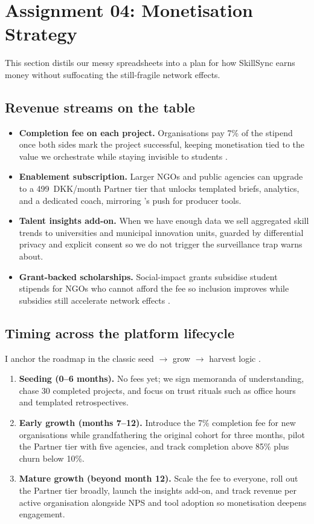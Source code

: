 \section*{Assignment 04: Monetisation Strategy}

This section distils our messy spreadsheets into a plan for how SkillSync earns money without suffocating the still-fragile network effects.

\subsection*{Revenue streams on the table}
\begin{itemize}
  \item \textbf{Completion fee on each project.} Organisations pay 7\% of the stipend once both sides mark the project successful, keeping monetisation tied to the value we orchestrate while staying invisible to students \citep{HagiuWright2013}.
  \item \textbf{Enablement subscription.} Larger NGOs and public agencies can upgrade to a 499~DKK/month Partner tier that unlocks templated briefs, analytics, and a dedicated coach, mirroring \citet{Choudary2016}'s push for producer tools.
  \item \textbf{Talent insights add-on.} When we have enough data we sell aggregated skill trends to universities and municipal innovation units, guarded by differential privacy and explicit consent so we do not trigger the surveillance trap \citet{Zuboff2019} warns about.
  \item \textbf{Grant-backed scholarships.} Social-impact grants subsidise student stipends for NGOs who cannot afford the fee so inclusion improves while subsidies still accelerate network effects \citep{ShapiroVarian1999}.
\end{itemize}

\subsection*{Timing across the platform lifecycle}
I anchor the roadmap in the classic seed $\rightarrow$ grow $\rightarrow$ harvest logic \citep{Choudary2016}.
\begin{enumerate}
  \item \textbf{Seeding (0--6 months).} No fees yet; we sign memoranda of understanding, chase 30 completed projects, and focus on trust rituals such as office hours and templated retrospectives.
  \item \textbf{Early growth (months 7--12).} Introduce the 7\% completion fee for new organisations while grandfathering the original cohort for three months, pilot the Partner tier with five agencies, and track completion above 85\% plus churn below 10\%.
  \item \textbf{Mature growth (beyond month 12).} Scale the fee to everyone, roll out the Partner tier broadly, launch the insights add-on, and track revenue per active organisation alongside NPS and tool adoption so monetisation deepens engagement.
\end{enumerate}

